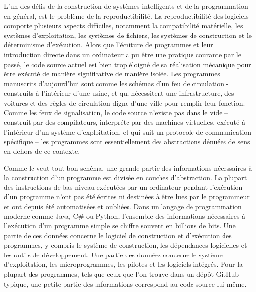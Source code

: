 L'un des défis de la construction de systèmes intelligents et de la programmation en général, est le problème de la reproductibilité. La reproductibilité des logiciels comporte plusieurs aspects difficiles, notamment la compatibilité matérielle, les systèmes d'exploitation, les systèmes de fichiers, les systèmes de construction et le déterminisme d'exécution. Alors que l'écriture de programmes et leur introduction directe dans un ordinateur a pu être une pratique courante par le passé, le code source actuel est bien trop éloigné de sa réalisation mécanique pour être exécuté de manière significative de manière isolée. Les programmes manuscrits d'aujourd'hui sont comme les schémas d'un feu de circulation - construits à l'intérieur d'une usine, et qui nécessitent une infrastructure, des voitures et des règles de circulation digne d'une ville pour remplir leur fonction. Comme les feux de signalisation, le code source n'existe pas dans le vide -- construit par des compilateurs, interprété par des machines virtuelles, exécuté à l'intérieur d'un système d'exploitation, et qui suit un protocole de communication spécifique -- les programmes sont essentiellement des abstractions dénuées de sens en dehors de ce contexte.

Comme le veut tout bon schéma, une grande partie des informations nécessaires à la construction d'un programme est divisée en couches d'abstraction. La plupart des instructions de bas niveau exécutées par un ordinateur pendant l'exécution d'un programme n'ont pas été écrites ni destinées à être lues par le programmeur et ont depuis été automatisées et oubliées. Dans un langage de programmation moderne comme Java, C\# ou Python, l'ensemble des informations nécessaires à l'exécution d'un programme simple se chiffre souvent en billions de bits. Une partie de ces données concerne le logiciel de construction et d'exécution des programmes, y compris le système de construction, les dépendances logicielles et les outils de développement. Une partie des données concerne le système d'exploitation, les microprogrammes, les pilotes et les logiciels intégrés. Pour la plupart des programmes, tels que ceux que l'on trouve dans un dépôt GitHub typique, une petite partie des informations correspond au code source lui-même.

